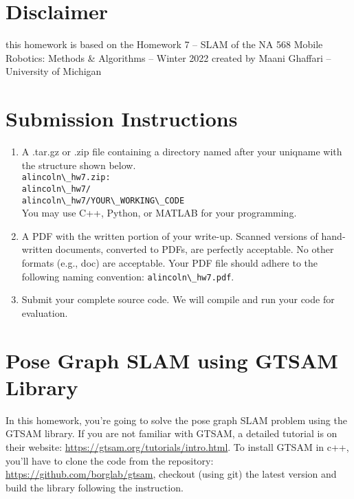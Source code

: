 \documentclass[tp]{lcc}
\begin{document}
\maketitle


\section{Disclaimer}
this homework is based on the Homework 7 -- SLAM of the NA 568 Mobile Robotics: Methods \& Algorithms -- Winter 2022 created by Maani Ghaffari -- University of Michigan

\section*{Submission Instructions}

\begin{enumerate}
    \item A .tar.gz or .zip file containing a directory named after your uniqname with the structure shown below. \\
    \lstinline[style=bash]{alincoln\_hw7.zip:} \\
    \lstinline[style=bash]{alincoln\_hw7/} \\
    \lstinline[style=bash]{alincoln\_hw7/YOUR\_WORKING\_CODE} \\
    You may use C++, Python, or MATLAB for your programming.

    \item A PDF with the written portion of your write-up. Scanned versions of hand-written documents, converted to PDFs, are perfectly acceptable. No other formats (e.g., doc) are acceptable. Your PDF file should adhere to the following naming convention: \lstinline[style=bash]{alincoln\_hw7.pdf}.

    \item Submit your complete source code. We will compile and run your code for evaluation.
\end{enumerate}

\section{Pose Graph SLAM using GTSAM Library}
In this homework, you’re going to solve the pose graph SLAM problem using the GTSAM library. If you are not familiar with GTSAM, a detailed tutorial is on their website: \url{https://gtsam.org/tutorials/intro.html}. To install GTSAM in c++, you’ll have to clone the code from the repository: \url{https://github.com/borglab/gtsam}, checkout (using git) the latest version and build the library following the instruction.
\end{document}
